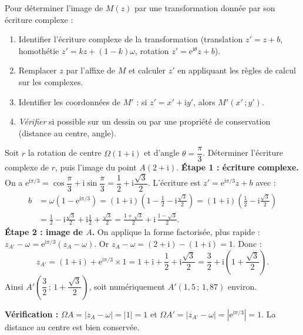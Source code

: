 \documentclass[11pt]{article}
\begin{document}
\begin{methode}
Pour déterminer l'image de $M(z)$ par une transformation donnée par son écriture complexe :
\begin{enumerate}
\item Identifier l'écriture complexe de la transformation (translation $z' = z + b$, homothétie $z' = kz + (1-k)\omega$, rotation $z' = \mathrm{e}^{\mathrm{i}\theta}z + b$).
\item Remplacer $z$ par l'affixe de $M$ et calculer $z'$ en appliquant les règles de calcul sur les complexes.
\item Identifier les coordonnées de $M'$ : si $z' = x' + \mathrm{i}y'$, alors $M'(x'\,;y')$.
\item \emph{Vérifier} si possible sur un dessin ou par une propriété de conservation (distance au centre, angle).
\end{enumerate}
\end{methode}

\begin{exoresolu}
Soit $r$ la rotation de centre $\Omega(1 + \mathrm{i})$ et d'angle $\theta = \dfrac{\pi}{3}$. Déterminer l'écriture complexe de $r$, puis l'image du point $A(2 + \mathrm{i})$.
\tcblower
\textbf{Étape 1 : écriture complexe.} On a $\mathrm{e}^{\mathrm{i}\pi/3} = \cos\dfrac{\pi}{3} + \mathrm{i}\sin\dfrac{\pi}{3} = \dfrac{1}{2} + \mathrm{i}\dfrac{\sqrt{3}}{2}$. L'écriture est $z' = \mathrm{e}^{\mathrm{i}\pi/3} z + b$ avec :
\begin{align*}
b &= \omega\left(1 - \mathrm{e}^{\mathrm{i}\pi/3}\right) = (1 + \mathrm{i})\left(1 - \frac{1}{2} - \mathrm{i}\frac{\sqrt{3}}{2}\right) = (1 + \mathrm{i})\left(\frac{1}{2} - \mathrm{i}\frac{\sqrt{3}}{2}\right)\\
&= \frac{1}{2} - \mathrm{i}\frac{\sqrt{3}}{2} + \mathrm{i}\frac{1}{2} + \frac{\sqrt{3}}{2} = \frac{1 + \sqrt{3}}{2} + \mathrm{i}\,\frac{1 - \sqrt{3}}{2}.
\end{align*}
\textbf{Étape 2 : image de $A$.} On applique la forme factorisée, plus rapide : $z_{A'} - \omega = \mathrm{e}^{\mathrm{i}\pi/3}(z_A - \omega)$. Or $z_A - \omega = (2 + \mathrm{i}) - (1 + \mathrm{i}) = 1$. Donc :
\[z_{A'} = (1 + \mathrm{i}) + \mathrm{e}^{\mathrm{i}\pi/3} \times 1 = 1 + \mathrm{i} + \frac{1}{2} + \mathrm{i}\frac{\sqrt{3}}{2} = \frac{3}{2} + \mathrm{i}\left(1 + \frac{\sqrt{3}}{2}\right).\]
Ainsi $A'\left(\dfrac{3}{2}\,;\,1 + \dfrac{\sqrt{3}}{2}\right)$, soit numériquement $A'(1{,}5\,;\,1{,}87)$ environ.

\textbf{Vérification :} $\Omega A = |z_A - \omega| = |1| = 1$ et $\Omega A' = |z_{A'} - \omega| = |\mathrm{e}^{\mathrm{i}\pi/3}| = 1$. La distance au centre est bien conservée.
\end{exoresolu}
\end{document}

